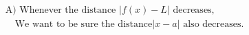 \documentclass[preview]{standalone}
\begin{document}
\begin{align*}
\text{A) Whenever the distance } |f(x) - L| \text{ decreases,} \\
                             \quad \text{We want to be sure the distance} |x - a| \text{ also decreases.}
\end{align*}
\end{document}
